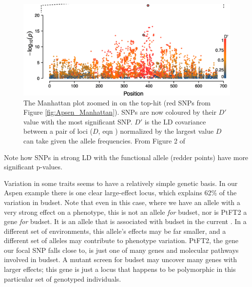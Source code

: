 \begin{figure}
\begin{center}
\includegraphics[width=\textwidth]{Journal_figs/Quant_gen/Wang_GWAS_poplar/Wang_Fig_zoomed_Manhattan.pdf}
\end{center}
\caption{The Manhattan plot zoomed in on the top-hit (red SNPs from Figure
  \ref{fig:Apsen_Manhattan}). SNPs are now coloured by their $D\prime$
  value with the most significant SNP. $D\prime$ is the LD
  covariance between a pair of loci ($D$, eqn ) normalized by
  the largest value $D$ can take given the allele frequencies. From
  Figure 2 of } \label{fig:Apsen_zoom_Manhattan}
\end{figure}
Note how SNPs in strong LD with the functional allele (redder
points) have more significant p-values. 

Variation in some traits seems to have a relatively simple genetic
basis. In our Aspen example there is one clear large-effect locus,
which explains  62\% of the variation in budset. Note that even in this case, where we have an allele with a very strong effect on a phenotype, this is not an allele {\it for} budset, nor is PtFT2 a gene {\it for} budset. It is an allele that is associated with budset in the current . In a different set of environments, this allele's effects may be far smaller, and a different set of alleles may contribute to phenotype variation. PtFT2, the gene our focal SNP falls close to, is just one of many genes and molecular pathways involved in budset. A mutant screen for budset may uncover many genes with larger effects; this gene is just a locus that happens to be polymorphic in this particular set of genotyped individuals. 

